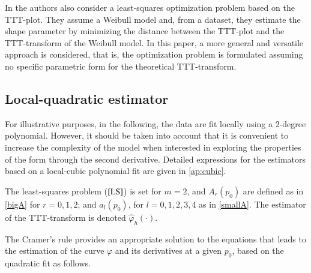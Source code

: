 \documentclass[preprint,12pt]{elsarticle}
\begin{document}
In \cite{ZHMS2018} the authors also consider a least-squares optimization problem based on the TTT-plot. They assume a Weibull model and, from a dataset, they estimate the shape parameter by minimizing the distance between the TTT-plot and the TTT-transform of the Weibull model. In this paper, a more general and versatile approach is considered, that is, the optimization problem is formulated assuming no specific parametric form for the theoretical TTT-transform.


\subsection{Local-quadratic estimator}\label{quad}
For illustrative purposes, in the following, the data are fit locally using a 2-degree polynomial. However, it should be taken into account that it is convenient to increase the complexity of the model when interested in exploring the properties of the form through the second derivative. Detailed expressions for the estimators based on a local-cubic polynomial fit are given in \ref{ap:cubic}.

The least-squares problem  ($\ref{LS}$) is set for $m=2$, and $A_r(p_0)$ are defined as in \eqref{bigA} for $ r=0,1,2$; and  $
a_l(p_0)$, for $ l=0, 1, 2, 3, 4$ as in \eqref{smallA}. The estimator of the TTT-transform is denoted $\widehat{\varphi}_{h}(\cdot)$. 


The Cramer's rule provides an appropriate solution to the equations that leads to the estimation of the curve $\varphi$ and its derivatives at a given $p_0$, based on the quadratic fit as follows.
\end{document}
